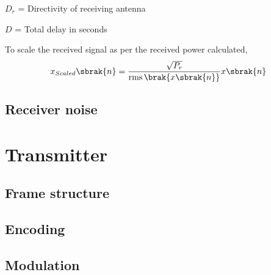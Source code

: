 \documentclass[11pt]{book}
\begin{document}
$D_r$ = Directivity of receiving antenna 

$D$ = Total delay in seconds

To scale the received signal as per the received power calculated,
\begin{equation}
    x_{Scaled}\sbrak{n} = \frac{\sqrt{P_r}}{\operatorname{rms}\brak{x\sbrak{n}}}x\sbrak{n}
\end{equation}   

\section{Receiver noise}


\chapter{Transmitter}
\section{Frame structure}
\section{Encoding}
\section{Modulation}

\backmatter
\appendix
%

\latexprintindex
\end{document}
